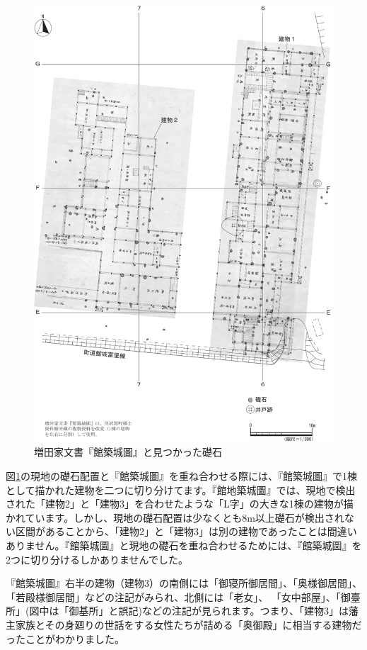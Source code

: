 \documentclass[11pt,report]{jsbook}
\begin{document}
\begin{figure}[h]
\centering
\includegraphics[width=160truemm]{fig/12.pdf}
\caption{増田家文書『館築城圖』と見つかった礎石}
\label{fig12}
\end{figure}


図\ref{fig12}の現地の礎石配置と『館築城圖』を重ね合わせる際には、『館築城圖』で1棟として描かれた建物を二つに切り分けてます。『館地築城圖』では、現地で検出された「建物2」と「建物3」を合わせたような「L字」の大きな1棟の建物が描かれています。しかし、現地の礎石配置は少なくとも8m以上礎石が検出されない区間があることから、「建物2」と「建物3」は別の建物であったことは間違いありません。『館築城圖』と現地の礎石を重ね合わせるためには、『館築城圖』を2つに切り分けるしかありませんでした。

『館築城圖』右半の建物（建物3）の南側には「御寝所御居間」、「奥様御居間」、「若殿様御居間」などの注記がみられ、北側には「老女」、
「女中部屋」、「御臺所」(図中は「御基所」と誤記)などの注記が見られます。つまり、「建物3」は藩主家族とその身廻りの世話をする女性たちが詰める「奥御殿」に相当する建物だったことがわかりました。
\end{document}
